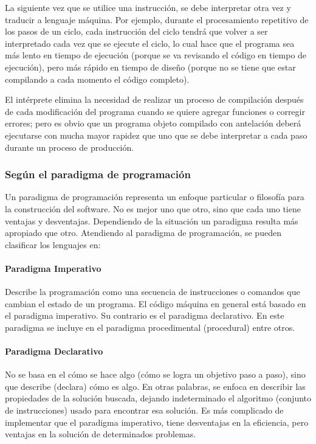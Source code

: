\documentclass[12pt,legalpaper]{report}
\begin{document}
La siguiente vez que se utilice una instrucción, se debe interpretar otra vez y traducir a lenguaje máquina. Por ejemplo, durante el procesamiento repetitivo de los pasos de un ciclo, cada instrucción del ciclo tendrá que volver a ser interpretado cada vez que se ejecute el ciclo, lo cual hace que el programa sea más lento en tiempo de ejecución (porque se va revisando el código en tiempo de ejecución), pero más rápido en tiempo de diseño (porque no se tiene que estar compilando a cada momento el código completo). 

El intérprete elimina la necesidad de realizar un proceso de compilación después de cada modificación del programa cuando se quiere agregar funciones o corregir errores; pero es obvio que un programa objeto compilado con antelación deberá ejecutarse con mucha mayor rapidez que uno que se debe interpretar a cada paso durante un proceso de producción.

			\subsubsection{Según el paradigma de programación}

Un paradigma de programación representa un enfoque particular o filosofía para la construcción del software. No es mejor uno que otro, sino que cada uno tiene ventajas y desventajas. Dependiendo de la situación un paradigma resulta más apropiado que otro. Atendiendo al paradigma de programación, se pueden clasificar los lenguajes en:


					\paragraph{Paradigma Imperativo}
				
Describe la programación como una secuencia de instrucciones o comandos que cambian el estado de un programa. El código máquina en general está basado en el paradigma imperativo. Su contrario es el paradigma declarativo. En este paradigma se incluye en el paradigma procedimental (procedural) entre otros.
				
					\paragraph{Paradigma Declarativo}

No se basa en el cómo se hace algo (cómo se logra un objetivo paso a paso), sino que describe (declara) cómo es algo. En otras palabras, se enfoca en describir las propiedades de la solución buscada, dejando indeterminado el algoritmo (conjunto de instrucciones) usado para encontrar esa solución. Es más complicado de implementar que el paradigma imperativo, tiene desventajas en la eficiencia, pero ventajas en la solución de determinados problemas.
\end{document}
